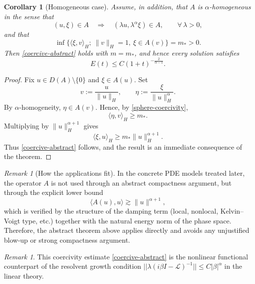 \documentclass[11pt,reqno]{amsart}
\newtheorem{corollary}[theorem]{Corollary}
\theoremstyle{remark}
\newtheorem{remark}[theorem]{Remark}
\begin{document}
\begin{corollary}[Homogeneous case]
Assume, in addition, that $A$ is $\alpha$-homogeneous in the sense that
\begin{equation}
(u,\xi)\in A \quad \Longrightarrow \quad (\lambda u,\lambda^\alpha \xi)\in A,
\qquad \forall\, \lambda>0,
\end{equation}
and that
\begin{equation}\label{sphere-coercivity}
\inf\big\{\langle \xi,v\rangle_H;\ \|v\|_H=1,\ \xi\in A(v)\big\}=m_*>0.
\end{equation}
Then \eqref{coercive-abstract} holds with $m=m_*$, and hence every solution satisfies
\begin{equation}
E(t)\le C(1+t)^{-\frac{2}{\alpha-1}}.
\end{equation}
\end{corollary}

\begin{proof}
Fix $u\in D(A)\setminus\{0\}$ and $\xi\in A(u)$. Set
\begin{equation}
v:=\frac{u}{\|u\|_H},
\qquad
\eta:=\frac{\xi}{\|u\|_H^\alpha}.
\end{equation}
By $\alpha$-homogeneity, $\eta\in A(v)$. Hence, by \eqref{sphere-coercivity},
\begin{equation}
\langle \eta,v\rangle_H \ge m_*.
\end{equation}
Multiplying by $\|u\|_H^{\alpha+1}$ gives
\begin{equation}
\langle \xi,u\rangle_H \ge m_*\|u\|_H^{\alpha+1}.
\end{equation}
Thus \eqref{coercive-abstract} follows, and the result is an immediate consequence of the theorem.
\end{proof}

\begin{remark}[How the applications fit]
In the concrete PDE models treated later, the operator $A$ is not used through an abstract compactness
argument, but through the explicit lower bound
\[
\langle A(u),u\rangle \gtrsim \|u\|^{\alpha+1},
\]
which is verified by the structure of the damping term (local, nonlocal, Kelvin--Voigt type, etc.)
together with the natural energy norm of the phase space. Therefore, the abstract theorem above applies
directly and avoids any unjustified blow-up or strong compactness argument.
\end{remark}

\begin{remark}
This coercivity estimate \eqref{coercive-abstract} is the nonlinear functional counterpart of the resolvent growth condition $||\lambda(i\beta I - \mathcal{L})^{-1}|| \leq C|\beta|^\alpha$ in the linear theory.
\end{remark}
\end{document}
